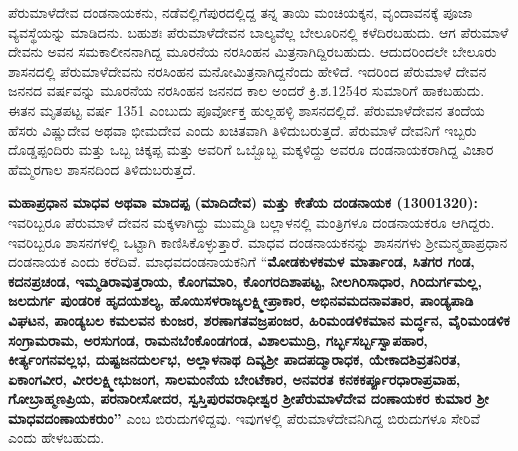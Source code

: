 ಪೆರುಮಾಳೆದೇವ ದಂಡನಾಯಕನು, ನಡೆವಲ್ಲಿಗೆಪುರದಲ್ಲಿದ್ದ ತನ್ನ ತಾಯಿ ಮಂಚಿಯಕ್ಕನ, ವೃಂದಾವನಕ್ಕೆ ಪೂಜಾ ವ್ಯವಸ್ಥೆ\-ಯನ್ನು ಮಾಡಿದನು. ಬಹುಶಃ ಪೆರುಮಾಳೆದೇವನ ಬಾಲ್ಯವೆಲ್ಲ ಬೇಲೂರಿನಲ್ಲಿ ಕಳೆದಿರಬಹುದು. ಆಗ ಪೆರುಮಾಳೆ ದೇವನು ಅವನ ಸಮಕಾಲೀನನಾಗಿದ್ದ ಮೂರನೆಯ ನರಸಿಂಹನ ಮಿತ್ರನಾಗಿದ್ದಿರಬಹುದು. ಆದುದರಿಂದಲೇ ಬೇಲೂರು ಶಾಸನದಲ್ಲಿ ಪೆರುಮಾಳೆದೇವನು ನರಸಿಂಹನ ಮನೋಮಿತ್ರನಾಗಿದ್ದನೆಂದು ಹೇಳಿದೆ. ಇದರಿಂದ ಪೆರುಮಾಳೆ ದೇವನ ಜನನದ ವರ್ಷವನ್ನು ಮೂರನೆಯ ನರಸಿಂಹನ ಜನನದ ಕಾಲ ಅಂದರೆ ಕ್ರಿ.ಶ.1254ರ ಸುಮಾರಿಗೆ ಹಾಕಬಹುದು. ಈತನ ಮೃತಪಟ್ಟ ವರ್ಷ 1351 ಎಂಬುದು ಪೂರ್ವೋಕ್ತ ಹುಲ್ಲಹಳ್ಳಿ ಶಾಸನದಲ್ಲಿದೆ. ಪೆರುಮಾಳೆದೇವನ ತಂದೆಯ ಹೆಸರು ವಿಷ್ಣುದೇವ ಅಥವಾ ಭೀಮದೇವ ಎಂದು ಖಚಿತವಾಗಿ ತಿಳಿದುಬರುತ್ತದೆ. ಪೆರುಮಾಳೆ ದೇವನಿಗೆ ಇಬ್ಬರು ದೊಡ್ಡಪ್ಪಂದಿರು ಮತ್ತು ಒಬ್ಬ ಚಿಕ್ಕಪ್ಪ ಮತ್ತು ಅವರಿಗೆ ಒಬ್ಬೊಬ್ಬ ಮಕ್ಕಳಿದ್ದು ಅವರೂ ದಂಡನಾಯಕರಾಗಿದ್ದ ವಿಚಾರ ಹೆಮ್ಮರಗಾಲ ಶಾಸನದಿಂದ ತಿಳಿದುಬರುತ್ತದೆ.

\textbf{ಮಹಾಪ್ರಧಾನ ಮಾಧವ ಅಥವಾ ಮಾದಪ್ಪ (ಮಾದಿದೇವ) ಮತ್ತು ಕೇತೆಯ ದಂಡನಾಯಕ (1300\general{\enginline{-}}1320): } ಇವರಿಬ್ಬರೂ ಪೆರುಮಾಳೆ ದೇವನ ಮಕ್ಕಳಾಗಿದ್ದು ಮುಮ್ಮಡಿ ಬಲ್ಲಾಳನಲ್ಲಿ ಮಂತ್ರಿಗಳೂ ದಂಡನಾಯಕರೂ ಆಗಿದ್ದರು. ಇವರಿಬ್ಬರೂ ಶಾಸನಗಳಲ್ಲಿ ಒಟ್ಟಾಗಿ ಕಾಣಿಸಿಕೊಳ್ಳುತ್ತಾರೆ. ಮಾಧವ ದಂಡನಾಯಕನನ್ನು ಶಾಸನಗಳು ಶ‍್ರೀಮನ್ಮಹಾಪ್ರಧಾನ ದಂಡನಾಯಕ ಎಂದು ಕರೆದಿವೆ. ಮಾಧವದಂಡನಾಯಕನಿಗೆ “\textbf{ಮೋಡಕುಳಕಮಳ ಮಾರ್ತಾಂಡ, ಸಿತಗರ ಗಂಡ, ಕದನಪ್ರಚಂಡ,\general{\break } ಇಮ್ಮಡಿರಾವುತ್ತರಾಯ, ಕೊಂಗಮಾರಿ, ಕೊಂಗರದಿಶಾಪಟ್ಟ, ನೀಲಗಿರಿಸಾಧಾರ, ಗಿರಿದುರ್ಗಮಲ್ಲ, ಜಲದುರ್ಗ ಪುಂಡರಿಕ ಹೃದಯಶಲ್ಯ, ಹೊಯಿಸಳರಾಜ್ಯಲಕ್ಷ್ಮೀಪ್ರಾಕಾರ, ಅಭಿನವಮದನಾವತಾರ, ಪಾಂಡ್ಯಪಾಡಿ ವಿಘಟನ, ಪಾಂಡ್ಯಬಲ ಕಮಲವನ ಕುಂಜರ, ಶರಣಾಗತವಜ್ರಪಂಜರ, ಹಿರಿಮಂಡಳಿಕಮಾನ ಮರ್ದ್ಧನ, ವೈರಿಮಂಡಳಿಕ ಸಂಗ್ರಾಮರಾಮ, ಅರಸುಗಂಡ,\general{\break } ರಾಮನಬೆಂಕೊಂಡಗಂಡ, ವಿಶಾಲಮುದ್ರಿ, ಗರ್ಬ್ಭಸರ್ಬ್ಬಸ್ವಾಪಹಾರ, ಕೀರ್ತ್ಯಂಗನವಲ್ಲಭ, ದುಷ್ಟಜನದುರ್ಲಭ, ಅಲ್ಲಾಳನಾಥ ದಿವ್ಯಶ‍್ರೀ ಪಾದಪದ್ಮಾರಾಧಕ, ಯೇಕಾದಶಿವ್ರತನಿರತ, ಏಕಾಂಗವೀರ, ವೀರಲಕ್ಷ್ಮೀಭುಜಂಗ, ಸಾಲಮಂನೆಯ ಬೇಂಟೆಕಾರ, ಅನವರತ ಕನಕಕರ್ಪ್ಪೂರಧಾರಾಪ್ರವಾಹ, ಗೋಬ್ರಾಹ್ಮಣಪ್ರಿಯ, ಪರನಾರೀಸೋದರ, ಸ್ವಸ್ತಿಪುರವರಾಧೀಶ್ವರ\general{\break } ಶ‍್ರೀಪೆರುಮಾಳೆದೇವ ದಂಣಾಯಕರ ಕುಮಾರ ಶ‍್ರೀ ಮಾಧವದಂಣಾಯಕರುಂ”} ಎಂಬ ಬಿರುದುಗಳಿದ್ದವು. ಇವುಗಳಲ್ಲಿ ಪೆರುಮಾಳೆದೇವನಿಗಿದ್ದ ಬಿರುದುಗಳೂ ಸೇರಿವೆ ಎಂದು ಹೇಳಬಹುದು.

